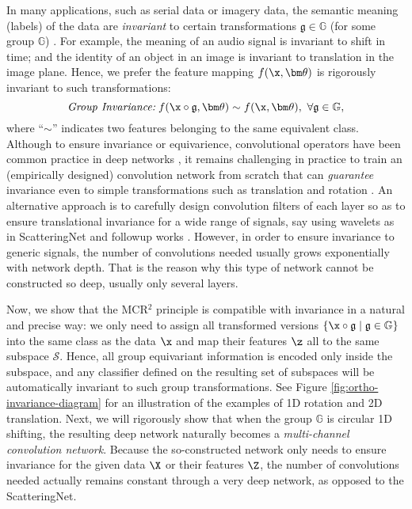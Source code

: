 \documentclass[../../book-main.tex]{subfiles}
\begin{document}
In many applications, such as serial data or imagery data, the semantic meaning (labels) of the data are  {\em invariant} to certain transformations $\mathfrak{g} \in \mathbb{G}$ (for some group $\mathbb{G}$) \cite{CohenW16,deep-sets-NIPS2017}. For example, the meaning of an audio signal is invariant to shift in time; and the identity of an object in an image is invariant to translation in the image plane. Hence, we prefer the feature mapping $f(\x,\bm \theta)$ is rigorously invariant to such transformations:
\begin{equation}
\mbox{\em Group Invariance:}\;   f(\x\circ \mathfrak{g}, \bm \theta) \sim f(\x,\bm \theta),\ \forall \mathfrak{g} \in \mathbb{G},
\end{equation}
where ``$\sim$'' indicates two features belonging to the same equivalent class. Although to ensure invariance or equivarience, convolutional operators have been common practice in deep networks \cite{CohenW16}, it remains challenging in practice to train an (empirically designed) convolution network from scratch that can {\em guarantee} invariance even to simple transformations such as translation and rotation \cite{azulay2018deep,engstrom2017rotation}. An alternative approach is to carefully design convolution filters of each layer so as to ensure translational invariance for a wide range of signals, say using wavelets as in ScatteringNet \cite{scattering-net} and followup works \cite{Wiatowski-2018}. However, in order to ensure invariance to generic signals, the number of convolutions needed usually grows exponentially with network depth. That is the reason why this type of network cannot be constructed so deep, usually only several layers. 

Now, we show that the MCR$^2$ principle is compatible with invariance in a natural and precise way: we only need to assign all transformed versions $\{\x\circ \mathfrak{g} \mid \mathfrak{g} \in \mathbb G\}$  into the same class as the data $\x$ and map their features $\z$ all to the same subspace $\mathcal S$. Hence, all group equivariant information is encoded only inside the subspace, and any classifier defined on the resulting set of subspaces will be automatically invariant to such group transformations. See Figure \ref{fig:ortho-invariance-diagram} for an illustration of the examples of 1D rotation and 2D translation.  Next, we will rigorously show that when the group $\mathbb G$ is circular 1D shifting, the resulting deep network naturally becomes a {\em multi-channel convolution network}. 
Because the so-constructed network only needs to ensure invariance for the given data $\X$ or their features $\Z$, the number of convolutions needed actually remains constant through a very deep network, as opposed to the ScatteringNet. 
\end{document}
